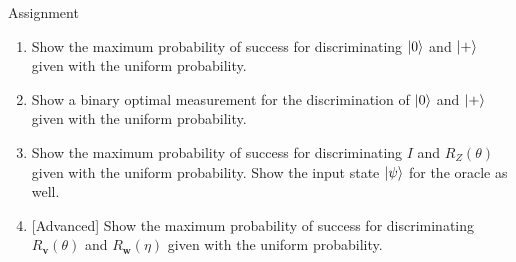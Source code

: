 \documentclass{beamer}
\begin{document}
\begin{frame}{Assignment}
\begin{enumerate}
\setlength{\itemsep}{2em}
\item Show the maximum probability of success for discriminating $\ket{0}$ and $\ket{+}$ given with the uniform probability.
\item Show a binary optimal measurement for the discrimination of $\ket{0}$ and $\ket{+}$ given with the uniform probability.
\item Show the maximum probability of success for discriminating $I$ and $R_Z(\theta)$ given with the uniform probability.
Show the input state $\ket{\psi}$ for the oracle as well.
\item {[Advanced]} Show the maximum probability of success for discriminating 
$R_{\mathbf{v}}(\theta)$ and $R_{\mathbf{w}}(\eta)$ given with the uniform probability.
\end{enumerate}
\end{frame}
\end{document}
